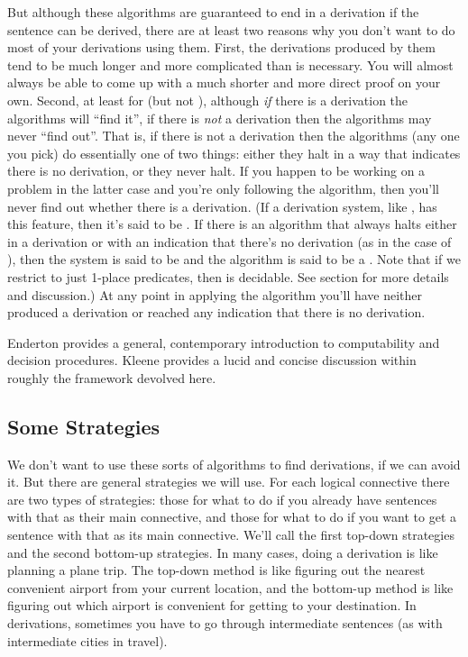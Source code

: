 But although these algorithms are guaranteed to end in a derivation if the sentence can be derived, there are at least two reasons why you don't want to do most of your derivations using them. 
First, the derivations produced by them tend to be much longer and more complicated than is necessary. 
You will almost always be able to come up with a much shorter and more direct proof on your own. 
Second, at least for \GQD{} (but not \GSD{}), although \emph{if} there is a derivation the algorithms will ``find it'', if there is \emph{not} a derivation then the algorithms may never ``find out''. 
That is, if there is not a derivation then the algorithms (any one you pick) do essentially one of two things: either they halt in a way that indicates there is no derivation, or they never halt. 
If you happen to be working on a problem in the latter case and you're only following the algorithm, then you'll never find out whether there is a derivation. 
(If a derivation system, like \GQD{}, has this feature, then it's said to be . 
If there is an algorithm that always halts either in a derivation or with an indication that there's no derivation (as in the case of \GSD{}), then the system is said to be  and the algorithm is said to be a .
Note that if we restrict \GQL{} to just 1-place predicates, then \GQD{} is decidable.
See section  for more details and discussion.)
At any point in applying the algorithm you'll have neither produced a derivation or reached any indication that there is no derivation.

Enderton \citeyearpar{Enderton2010} provides a general, contemporary introduction to computability and decision procedures. Kleene \citeyearpar[ch.~5]{Kleene1967} provides a lucid and concise discussion within roughly the framework devolved here.

\subsection{Some Strategies}\label{Sec:Some Strategies}
We don't want to use these sorts of algorithms to find derivations, if we can avoid it. 
But there are general strategies we will use. 
For each logical connective there are two types of strategies: those for what to do if you already have sentences with that as their main connective, and those for what to do if you want to get a sentence with that as its main connective. 
We'll call the first top-down strategies and the second bottom-up strategies.
In many cases, doing a derivation is like planning a plane trip. The top-down method is like figuring out the nearest convenient airport from your current location, and the bottom-up method is like figuring out which airport is convenient for getting to your destination. In derivations, sometimes you have to go through intermediate sentences (as with intermediate cities in travel).

